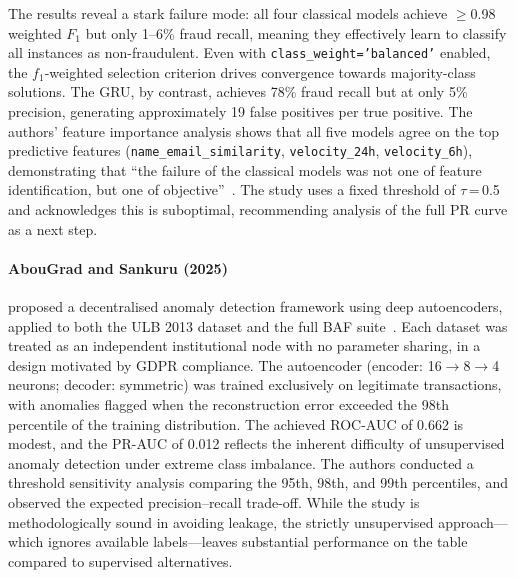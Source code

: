 The results reveal a stark failure mode: all four classical models achieve $\geq$0.98 weighted $F_1$ but only 1--6\% fraud recall, meaning they effectively learn to classify all instances as non-fraudulent. Even with \texttt{class\_weight='balanced'} enabled, the $f_1$-weighted selection criterion drives convergence towards majority-class solutions. The GRU, by contrast, achieves 78\% fraud recall but at only 5\% precision, generating approximately 19 false positives per true positive. The authors' feature importance analysis shows that all five models agree on the top predictive features (\texttt{name\_email\_similarity}, \texttt{velocity\_24h}, \texttt{velocity\_6h}), demonstrating that ``the failure of the classical models was not one of feature identification, but one of objective''~\cite{sun2025objective}. The study uses a fixed threshold of $\tau$\,=\,0.5 and acknowledges this is suboptimal, recommending analysis of the full PR curve as a next step.

\paragraph{AbouGrad and Sankuru (2025)}
proposed a decentralised anomaly detection framework using deep autoencoders, applied to both the ULB 2013 dataset and the full BAF suite~\cite{abougrad2025online}. Each dataset was treated as an independent institutional node with no parameter sharing, in a design motivated by GDPR compliance. The autoencoder (encoder: 16$\rightarrow$8$\rightarrow$4 neurons; decoder: symmetric) was trained exclusively on legitimate transactions, with anomalies flagged when the reconstruction error exceeded the 98th percentile of the training distribution. The achieved ROC-AUC of 0.662 is modest, and the PR-AUC of 0.012 reflects the inherent difficulty of unsupervised anomaly detection under extreme class imbalance. The authors conducted a threshold sensitivity analysis comparing the 95th, 98th, and 99th percentiles, and observed the expected precision--recall trade-off. While the study is methodologically sound in avoiding leakage, the strictly unsupervised approach---which ignores available labels---leaves substantial performance on the table compared to supervised alternatives.

